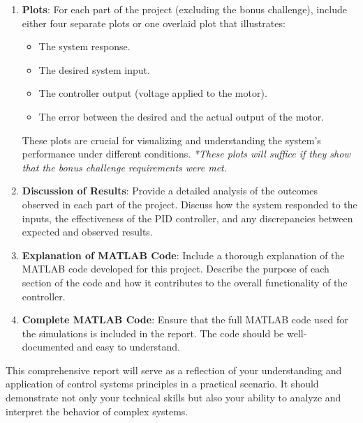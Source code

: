 \documentclass[11pt]{article}
\begin{document}
\begin{enumerate}
    \item \textbf{Plots}: For each part of the project (excluding the bonus challenge), include either four separate plots or one overlaid plot that illustrates:
    \begin{itemize}
        \item The system response.
        \item The desired system input.
        \item The controller output (voltage applied to the motor).
        \item The error between the desired and the actual output of the motor.
    \end{itemize}
    These plots are crucial for visualizing and understanding the system's performance under different conditions. \textit{*These plots will suffice if they show that the bonus challenge requirements were met.}

    \item \textbf{Discussion of Results}: Provide a detailed analysis of the outcomes observed in each part of the project. Discuss how the system responded to the inputs, the effectiveness of the PID controller, and any discrepancies between expected and observed results.

    \item \textbf{Explanation of MATLAB Code}: Include a thorough explanation of the MATLAB code developed for this project. Describe the purpose of each section of the code and how it contributes to the overall functionality of the controller.

    \item \textbf{Complete MATLAB Code}: Ensure that the full MATLAB code used for the simulations is included in the report. The code should be well-documented and easy to understand.
\end{enumerate}

This comprehensive report will serve as a reflection of your understanding and application of control systems principles in a practical scenario. It should demonstrate not only your technical skills but also your ability to analyze and interpret the behavior of complex systems.

\newpage
\end{document}

